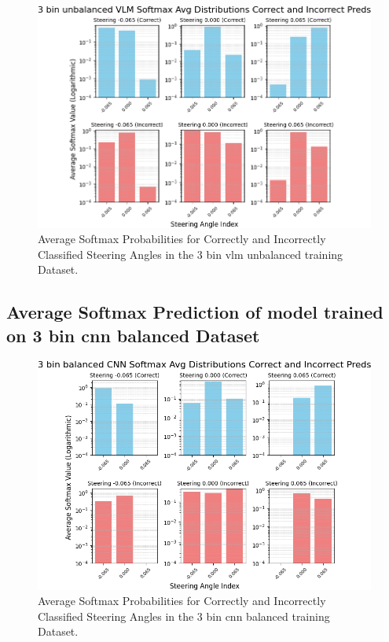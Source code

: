 \begin{figure}[H]
    \centering
    \includegraphics[width=1\linewidth]{Figures/Results/3_bins_vlm_softmax_dist_plot_unbalanced.png}
    \caption{Average Softmax Probabilities for Correctly and Incorrectly Classified Steering Angles in the 3 bin vlm unbalanced training Dataset.}
    \label{fig:3_bins_vlm_softmax_dist_unbalanced}
\end{figure}


\subsection{Average Softmax Prediction of model trained on 3 bin cnn balanced Dataset}

\begin{figure}[H]
    \centering
    \includegraphics[width=1\linewidth]{Figures/Results/3_bins_cnn_softmax_dist_plot_balanced.png}
    \caption{Average Softmax Probabilities for Correctly and Incorrectly Classified Steering Angles in the 3 bin cnn balanced training Dataset.}
    \label{fig:3_bins_cnn_softmax_dist_balanced}
\end{figure}

